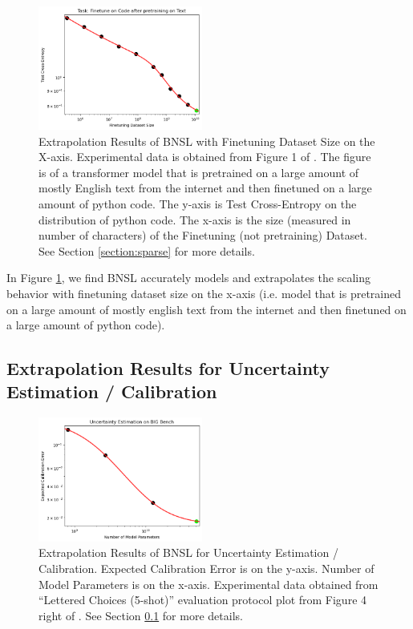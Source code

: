 \documentclass{article} %
\begin{document}
\begin{figure}[htbp]
    \centering
\includegraphics[width=0.48\textwidth]{figures/finetuning/language_code_finetuning.png}
    \caption{
Extrapolation Results of BNSL with Finetuning Dataset Size on the X-axis. Experimental data is obtained from Figure 1 of \cite{2021arXiv210201293H}. The figure is of a transformer model that is pretrained on a large amount of mostly English text from the internet and then finetuned on a large amount of python code. The y-axis is Test Cross-Entropy on the distribution of python code. The x-axis is the size (measured in number of characters) of the Finetuning (not pretraining) Dataset. See Section \ref{section:sparse} for more details.
    }
    \label{fig:finetuning}
\end{figure}

In Figure \ref{fig:finetuning}, we find BNSL accurately models and extrapolates the scaling behavior with finetuning dataset size on the x-axis (i.e. model that is pretrained on a large amount of mostly english text from the internet and then finetuned on a large amount of python code).

\subsection{Extrapolation Results for Uncertainty Estimation / Calibration}
\label{section:uncertainty}

\begin{figure}[htbp]
    \centering
\includegraphics[width=0.48\textwidth]{figures/uncertainty/uncertainty.png}
    \caption{
Extrapolation Results of BNSL for Uncertainty Estimation / Calibration. Expected Calibration Error is on the y-axis. Number of Model Parameters is on the x-axis. Experimental data obtained from ``Lettered Choices (5-shot)'' evaluation protocol plot from Figure 4 right of \cite{kadavath2022language}. See Section \ref{section:uncertainty} for more details.
    }
    \label{fig:uncertainty}
\end{figure}
\end{document}

